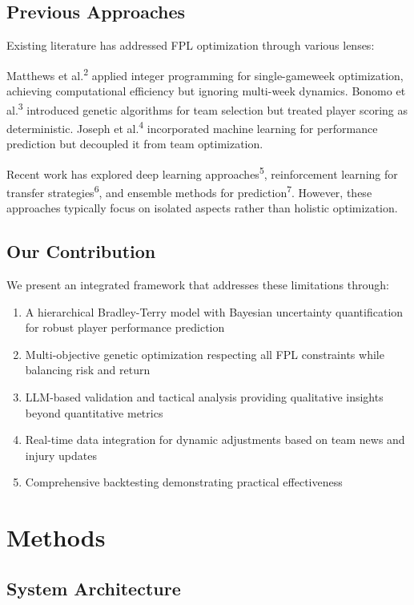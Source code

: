 \documentclass[10pt,a4paper,twocolumn]{article}
\begin{document}
\subsection*{Previous Approaches}

Existing literature has addressed FPL optimization through various lenses:

Matthews et al.\textsuperscript{2} applied integer programming for single-gameweek optimization, achieving computational efficiency but ignoring multi-week dynamics. Bonomo et al.\textsuperscript{3} introduced genetic algorithms for team selection but treated player scoring as deterministic. Joseph et al.\textsuperscript{4} incorporated machine learning for performance prediction but decoupled it from team optimization.

Recent work has explored deep learning approaches\textsuperscript{5}, reinforcement learning for transfer strategies\textsuperscript{6}, and ensemble methods for prediction\textsuperscript{7}. However, these approaches typically focus on isolated aspects rather than holistic optimization.

\subsection*{Our Contribution}

We present an integrated framework that addresses these limitations through:

\begin{enumerate}
\item A hierarchical Bradley-Terry model with Bayesian uncertainty quantification for robust player performance prediction
\item Multi-objective genetic optimization respecting all FPL constraints while balancing risk and return
\item LLM-based validation and tactical analysis providing qualitative insights beyond quantitative metrics
\item Real-time data integration for dynamic adjustments based on team news and injury updates
\item Comprehensive backtesting demonstrating practical effectiveness
\end{enumerate}

\section*{Methods}

\subsection*{System Architecture}
\end{document}
